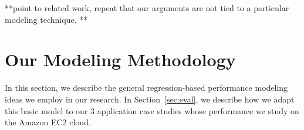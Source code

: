 \documentclass{acm_proc_article-sp}
\begin{document}
**point to related work, repeat that our arguments are not tied to a particular modeling technique. **


\section{Our Modeling Methodology}
\label{sec:model}
\vspace{10pt}
In this section, we describe the general regression-based performance modeling ideas we employ in our research. In Section~\ref{sec:eval}, we describe how we adapt this basic model to our 3 application case studies whose performance we study on the Amazon EC2 cloud. 

\end{document}
